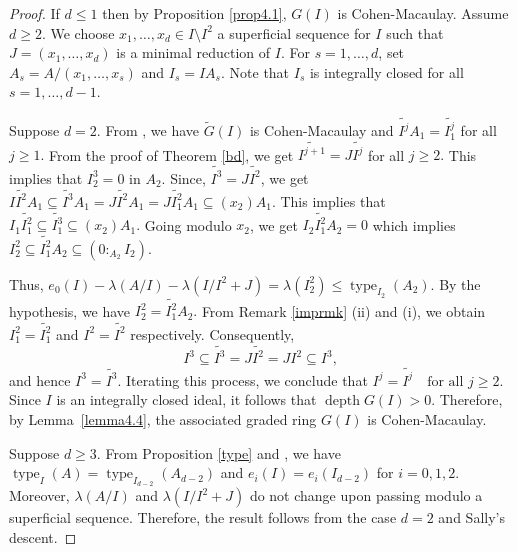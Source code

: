 \documentclass[11pt]{amsart}
\theoremstyle{plain}
\newcommand{\wt}{\widetilde}
\newcommand{\depth}{\operatorname{depth}}
\newcommand{\type}{\operatorname{type}}
\theoremstyle{plain}
\begin{document}
\begin{proof}
    If $d\leq 1$ then by Proposition \ref{prop4.1}, $G(I)$ is Cohen-Macaulay.
Assume $d \geq 2.$ We choose $x_{1},\ldots,x_{d} \in I\setminus I^2$  a superficial sequence for $I$ such that $J=(x_{1},\ldots,x_{d})$ is a minimal reduction of $I$. For $s=1,\ldots ,d$,  set $A_s=A/(x_{1},\ldots,x_{s})$ and $I_s=IA_{s}$. Note that  $I_s$ is integrally closed for all $s=1,\ldots , d-1.$

    
Suppose $d=2.$  From \cite[Proposition 3.4]{Part2}, we have $\wt{G}(I)$ is Cohen-Macaulay and ${\wt{I^j}}A_{1}=\wt{I^j_1}$ 
for all $j\geq 1.$ From the proof of Theorem \ref{bd}, we get $\wt{I^{j+1}}=J\wt{I^j}$ for all $j\geq 2.$ This implies that $I^3_2=0$ in $A_2.$  Since, $\wt{I^3}=J\wt{I^2}$, we get $ {I\wt{I^2}}A_{1}\subseteq {\wt{I^3}}A_{1}={J\wt{I^2}}A_{1} ={J}{\wt{I^2_1}}A_{1} \subseteq (x_2)A_1.$
This implies that $I_1\wt{I^2_1}\subseteq \wt{I^3_1}\subseteq (x_2)A_1.$
Going modulo $x_2$, we get $I_2{\wt{I^2_1}}A_{2}=0$ which implies $ I^2_2\subseteq {\wt{I^2_1}}A_{2}\subseteq (0:_{A_2}I_2).$

Thus, $ e_{0}(I)-\lambda(A/I)-\lambda(I/I^{2}+J)=\lambda(I^2_2)\leq \type_{I_2}(A_2).$ By the hypothesis, we have $I^2_2={\wt{I^2_1}}A_{2}.$ 
 From  Remark \ref{imprmk} (ii) and (i), we obtain $I_{1}^{2}=\widetilde{I_{1}^{2}}$ and  $I^{2}=\widetilde{I^{2}}$ respectively. Consequently,
$$I^{3}\subseteq \widetilde{I^{3}}=J\widetilde{I^{2}}=JI^{2}\subseteq I^{3},$$
and hence $I^{3}=\widetilde{I^{3}}$. Iterating this process, we conclude that
$I^{j}=\widetilde{I^{j}} \quad \text{for all } j\geq 2.$
Since $I$ is an integrally closed ideal, it follows that $\depth G(I)>0$.
Therefore, by Lemma~\ref{lemma4.4}, the associated graded ring $G(I)$ is
Cohen-Macaulay.


  Suppose $d\geq 3.$ From Proposition \ref{type} and \cite[Proposition 1.2]{rossi2010hilbert}, we have $\type_I(A)=\type_{I_{d-2}}(A_{d-2})$ and $e_i(I)=e_i(I_{d-2})$ for $i=0,1,2$. Moreover, $\lambda(A/I)$ and $\lambda(I/I^2+J)$ do not change upon passing modulo a superficial sequence. Therefore, the result follows from the case $d=2$ and Sally's descent. 
\end{proof}
\end{document}

